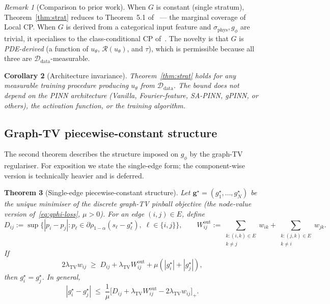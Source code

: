 \documentclass[11pt]{article}
\newtheorem{theorem}{Theorem}
\newtheorem{corollary}[theorem]{Corollary}
\theoremstyle{definition}
\theoremstyle{remark}
\newtheorem{remark}[theorem]{Remark}
\newcommand{\Ddata}{\mathcal{D}_{\text{data}}}
\newcommand{\sphys}{\sigma_{\mathrm{phys}}}
\newcommand{\TV}{\mathrm{TV}}
\newcommand{\Rop}{\mathcal{R}}
\begin{document}
\begin{remark}[Comparison to prior work]
When $G$ is constant (single stratum), Theorem~\ref{thm:strat} reduces to Theorem~5.1 of~\cite{yu2025cp} --- the marginal coverage of Local CP. When $G$ is derived from a categorical input feature and $\sphys, g_\phi$ are trivial, it specialises to the class-conditional CP of~\cite[\S4.2]{angelopoulos2022gentle}. The novelty is that $G$ is \emph{PDE-derived} (a function of $u_\theta$, $\Rop(u_\theta)$, and $\tau$), which is permissible because all three are $\Ddata$-measurable.
\end{remark}

\begin{corollary}[Architecture invariance]
\label{cor:arch}
Theorem~\ref{thm:strat} holds for any measurable training procedure producing $u_\theta$ from $\Ddata$. The bound does not depend on the PINN architecture (Vanilla, Fourier-feature, SA-PINN, gPINN, or others), the activation function, or the training algorithm.
\end{corollary}
\subsection{Graph-TV piecewise-constant structure}

The second theorem describes the structure imposed on $g_\phi$ by the graph-TV regulariser. For exposition we state the single-edge form; the component-wise version is technically heavier and is deferred.

\begin{theorem}[Single-edge piecewise-constant structure]
\label{thm:tv}
Let $\mathbf{g}^\star = (g^\star_1, \dots, g^\star_N)$ be the unique minimiser of the discrete graph-TV pinball objective (the node-value version of~\eqref{eq:gphi-loss}, $\mu > 0$). For an edge $(i, j) \in E$, define
\[
    D_{ij} := \sup\{|p_i - p_j| : p_\ell \in \partial \rho_{1-\alpha}(s_\ell - g^\star_\ell),\; \ell \in \{i,j\}\},
    \qquad
    W^{\text{out}}_{ij} := \!\!\!\sum_{\substack{k:(i,k)\in E \\ k \neq j}}\!\!\! w_{ik} + \!\!\!\sum_{\substack{k:(j,k)\in E \\ k \neq i}}\!\!\! w_{jk}.
\]
If
\begin{equation}
    2\lambda_{\TV} w_{ij} \;\geq\; D_{ij} + \lambda_{\TV} W^{\text{out}}_{ij} + \mu (|g^\star_i| + |g^\star_j|),
    \tag{$\dagger$}\label{eq:dag}
\end{equation}
then $g^\star_i = g^\star_j$. In general,
\begin{equation}
    |g^\star_i - g^\star_j| \;\leq\; \frac{1}{\mu}\Big[ D_{ij} + \lambda_{\TV} W^{\text{out}}_{ij} - 2\lambda_{\TV} w_{ij} \Big]_+.
\end{equation}
\end{theorem}
\end{document}
